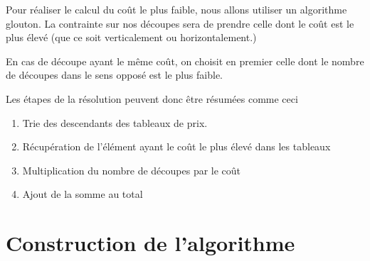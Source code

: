 \documentclass[11pt]{article}
\begin{document}
Pour réaliser le calcul du coût le plus faible, nous allons utiliser un algorithme glouton. La contrainte sur nos découpes sera de prendre celle dont le coût est le plus élevé (que ce soit verticalement ou horizontalement.)

En cas de découpe ayant le même coût, on choisit en premier celle dont le nombre de découpes dans le sens opposé est le plus faible.

Les étapes de la résolution peuvent donc être résumées comme ceci

\begin{enumerate}
	\item Trie des descendants des tableaux de prix.
	\item Récupération de l'élément ayant le coût le plus élevé dans les tableaux
	\item Multiplication du nombre de découpes par le coût
	\item Ajout de la somme au total 
\end{enumerate}

\section{Construction de l'algorithme}
\end{document}
